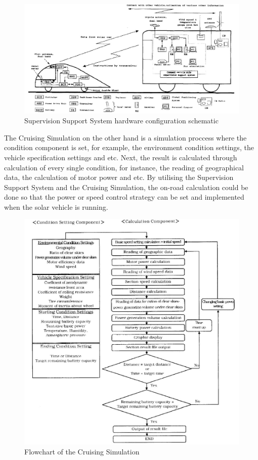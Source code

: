 \begin{figure}[htb]
	\centering
	\includegraphics[width=6in]{images/honda_supervision.jpg}
	\caption{Supervision Support System hardware configuration schematic \citep{03894304}}
	\label{im:honda_supervision}
\end{figure}

The Cruising Simulation on the other hand is a simulation proccess where the condition component is set, for example, the environment condition settings, the vehicle specification settings and etc. Next, the result is calculated through calculation of every single condition, for instance, the reading of geographical data, the calculation of motor power and etc. By utilising the Supervision Support System and the Cruising Simulation, the on-road calculation could be done so that the power or speed control strategy can be set and implemented when the solar vehicle is running.

\begin{figure}[htb]
	\centering
	\includegraphics[width=5.5in]{images/honda_flowchart.jpg}
	\caption{Flowchart of the Cruising Simulation \citep{03894304}}
	\label{im:honda_flowchart}
\end{figure}\clearpage

